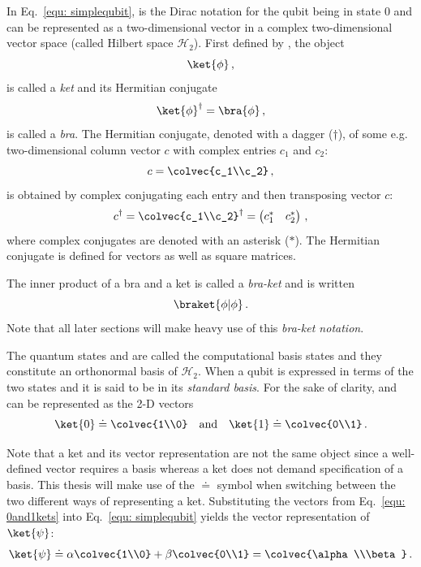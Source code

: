 In Eq.~\ref{equ: simplequbit}, \0 is the Dirac notation for the qubit being in state 0 and can be represented as a two-dimensional vector in a complex two-dimensional vector space (called Hilbert space $\mathcal{H}_{2}$). First defined by , the object
\begin{equation}
\ket{\phi}\, ,
\end{equation}
is called a \emph{ket} and its Hermitian conjugate
\begin{equation}
\ket{\phi}^\dagger = \bra{\phi}\, ,
\end{equation}
is called a \emph{bra}. The Hermitian conjugate, denoted with a dagger ($\dagger$), of some e.g. two-dimensional column vector $c$ with complex entries $c_1$ and $c_2$:
\begin{equation}
c = \colvec{c_1\\c_2}\, ,
\end{equation}
is obtained by complex conjugating each entry and then transposing vector $c$:
\begin{equation}
c^\dagger = \colvec{c_1\\c_2}^\dagger = \begin{pmatrix}c_1^* & c_2^*\end{pmatrix}\, ,
\end{equation}
where complex conjugates are denoted with an asterisk ($*$). The Hermitian conjugate is defined for vectors as well as square matrices.

The inner product of a bra and a ket is called a \emph{bra-ket} and is written
\begin{equation}
\braket{\phi|\phi}\, .
\end{equation}
Note that all later sections will make heavy use of this \emph{bra-ket notation}.

The quantum states \0 and \1 are called the computational basis states and they constitute an orthonormal basis of $\mathcal{H}_{2}$. When a qubit is expressed in terms of the two states \0 and \1 it is said to be in its \emph{standard basis}. For the sake of clarity, \0 and \1 can be represented as the 2-D vectors
\begin{equation}
\label{equ: 0and1kets}
\ket{0} \doteq  \colvec{1\\0} \quad \mathrm{and} \quad \ket{1} \doteq \colvec{0\\1} \, .
\end{equation}

Note that a ket and its vector representation are not the same object since a well-defined vector requires a basis whereas a ket does not demand specification of a basis. This thesis will make use of the $\doteq$ symbol when switching between the two different ways of representing a ket. Substituting the vectors from Eq.~\ref{equ: 0and1kets} into Eq.~\ref{equ: simplequbit} yields the vector representation of $\ket{\psi}$:
\begin{equation}
\label{equ: simplequbitvector}
\ket{\psi} \doteq \alpha \colvec{1\\0} + \beta \colvec{0\\1} = \colvec{\alpha\\\beta}\, .
\end{equation}

